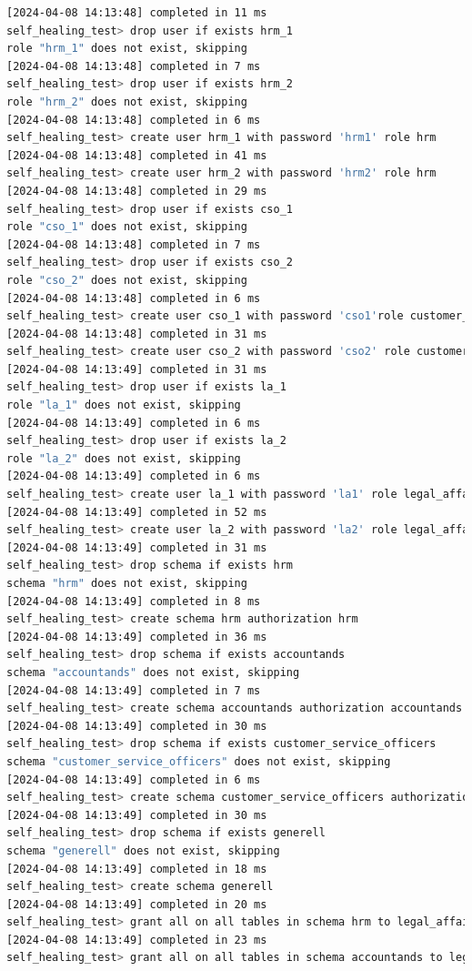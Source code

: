 \begin{flushleft}
\begin{lstlisting}[language=bash, caption=yugabyteDB - Evaluation-Testing,captionpos=b,label={lst:yugabytedb-evaluation-testing},breaklines=true]
[2024-04-08 14:13:48] completed in 11 ms
self_healing_test> drop user if exists hrm_1
role "hrm_1" does not exist, skipping
[2024-04-08 14:13:48] completed in 7 ms
self_healing_test> drop user if exists hrm_2
role "hrm_2" does not exist, skipping
[2024-04-08 14:13:48] completed in 6 ms
self_healing_test> create user hrm_1 with password 'hrm1' role hrm
[2024-04-08 14:13:48] completed in 41 ms
self_healing_test> create user hrm_2 with password 'hrm2' role hrm
[2024-04-08 14:13:48] completed in 29 ms
self_healing_test> drop user if exists cso_1
role "cso_1" does not exist, skipping
[2024-04-08 14:13:48] completed in 7 ms
self_healing_test> drop user if exists cso_2
role "cso_2" does not exist, skipping
[2024-04-08 14:13:48] completed in 6 ms
self_healing_test> create user cso_1 with password 'cso1'role customer_service_officers
[2024-04-08 14:13:48] completed in 31 ms
self_healing_test> create user cso_2 with password 'cso2' role customer_service_officers
[2024-04-08 14:13:49] completed in 31 ms
self_healing_test> drop user if exists la_1
role "la_1" does not exist, skipping
[2024-04-08 14:13:49] completed in 6 ms
self_healing_test> drop user if exists la_2
role "la_2" does not exist, skipping
[2024-04-08 14:13:49] completed in 6 ms
self_healing_test> create user la_1 with password 'la1' role legal_affairs
[2024-04-08 14:13:49] completed in 52 ms
self_healing_test> create user la_2 with password 'la2' role legal_affairs
[2024-04-08 14:13:49] completed in 31 ms
self_healing_test> drop schema if exists hrm
schema "hrm" does not exist, skipping
[2024-04-08 14:13:49] completed in 8 ms
self_healing_test> create schema hrm authorization hrm
[2024-04-08 14:13:49] completed in 36 ms
self_healing_test> drop schema if exists accountands
schema "accountands" does not exist, skipping
[2024-04-08 14:13:49] completed in 7 ms
self_healing_test> create schema accountands authorization accountands
[2024-04-08 14:13:49] completed in 30 ms
self_healing_test> drop schema if exists customer_service_officers
schema "customer_service_officers" does not exist, skipping
[2024-04-08 14:13:49] completed in 6 ms
self_healing_test> create schema customer_service_officers authorization customer_service_officers
[2024-04-08 14:13:49] completed in 30 ms
self_healing_test> drop schema if exists generell
schema "generell" does not exist, skipping
[2024-04-08 14:13:49] completed in 18 ms
self_healing_test> create schema generell
[2024-04-08 14:13:49] completed in 20 ms
self_healing_test> grant all on all tables in schema hrm to legal_affairs
[2024-04-08 14:13:49] completed in 23 ms
self_healing_test> grant all on all tables in schema accountands to legal_affairs

\end{lstlisting}
\end{flushleft}

